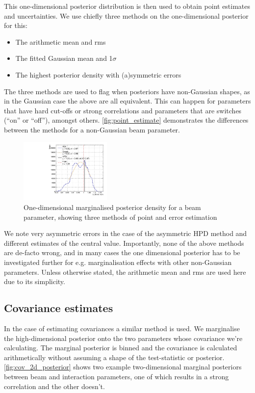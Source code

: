 This one-dimensional posterior distribution is then used to obtain point estimates and uncertainties. We use chiefly three methods on the one-dimensional posterior for this:
\begin{itemize}
	\item The arithmetic mean and rms
	\item The fitted Gaussian mean and 1$\sigma$
	\item The highest posterior density with (a)symmetric errors
\end{itemize}
The three methods are used to flag when posteriors have non-Gaussian shapes, as in the Gaussian case the above are all equivalent. This can happen for parameters that have hard cut-offs or strong correlations and parameters that are switches (``on'' or ``off''), amongst others. \autoref{fig:point_estimate} demonstrates the differences between the methods for a non-Gaussian beam parameter.
\begin{figure}[h]
	\includegraphics[width=0.4\textwidth, trim={0mm 0mm 0mm 0mm}, clip,page=1]{figures/mcmc/b88_example}
	\caption{One-dimensional marginalised posterior density for a beam parameter, showing three methods of point and error estimation}
	\label{fig:point_estimate}
\end{figure}
We note very asymmetric errors in the case of the asymmetric HPD method and different estimates of the central value. Importantly, none of the above methods are de-facto wrong, and in many cases the one dimensional posterior has to be investigated further for e.g. marginalisation effects with other non-Gaussian parameters. Unless otherwise stated, the arithmetic mean and rms are used here due to its simplicity.

\subsection{Covariance estimates}
In the case of estimating covariances a similar method is used. We marginalise the high-dimensional posterior onto the two parameters whose covariance we're calculating. The marginal posterior is binned and the covariance is calculated arithmetically without assuming a shape of the test-statistic or posterior. \autoref{fig:cov_2d_posterior} shows two example two-dimensional marginal posteriors between beam and interaction parameters, one of which results in a strong correlation and the other doesn't.

